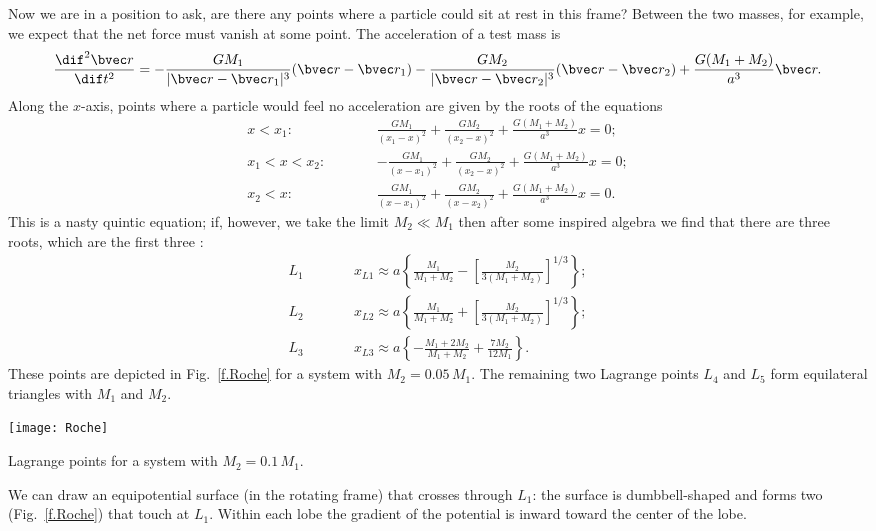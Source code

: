 Now we are in a position to ask, are there any points where a particle could sit at rest in this frame?
Between the two masses, for example, we expect that the net force must vanish at some point. The acceleration of a test mass is 
\begin{equation}\label{e.test-mass-acceleration-x}
\DDtt{\rv} = -\frac{GM_{1}}{|\rv-\rv_{1}|^{3}}(\rv-\rv_{1}) - \frac{GM_{2}}{|\rv-\rv_{2}|^{3}}(\rv-\rv_{2}) + \frac{G(M_{1}+M_{2})}{a^{3}} \rv.
\end{equation}
Along the $x$-axis, points where a particle would feel no acceleration are given by the roots of the equations
\begin{eqnarray*}
	x < x_{1}:&\qquad& \frac{GM_{1}}{(x_{1}-x)^{2}} + \frac{GM_{2}}{(x_{2}-x)^{2}} + \frac{G(M_{1}+M_{2})}{a^{3}} x = 0;\\
	x_{1} < x < x_{2}:&\qquad& -\frac{GM_{1}}{(x-x_{1})^{2}} + \frac{GM_{2}}{(x_{2}-x)^{2}} + \frac{G(M_{1}+M_{2})}{a^{3}} x = 0;\\
	x_{2} < x:&\qquad& \frac{GM_{1}}{(x-x_{1})^{2}} + \frac{GM_{2}}{(x-x_{2})^{2}} + \frac{G(M_{1}+M_{2})}{a^{3}} x = 0.
\end{eqnarray*}
This is a nasty quintic equation; if, however, we take the limit $M_{2}\ll M_{1}$ then after some inspired algebra we find that there are three roots, which are the first three :
\begin{eqnarray*}
L_{1} &\qquad& x_{L1} \approx a\left\{\frac{M_{1}}{M_{1}+M_{2}} - \left[\frac{M_{2}}{3(M_{1}+M_{2})}\right]^{1/3}\right\};\\
L_{2} &\qquad& x_{L2} \approx a\left\{\frac{M_{1}}{M_{1}+M_{2}} + \left[\frac{M_{2}}{3(M_{1}+M_{2})}\right]^{1/3}\right\};\\
L_{3} &\qquad& x_{L3} \approx a\left\{-\frac{M_{1}+2M_{2}}{M_{1}+M_{2}} + \frac{7M_{2}}{12M_{1}}\right\}.
\end{eqnarray*}
These points are depicted in Fig.~\ref{f.Roche} for a system with $M_{2} = 0.05\,M_{1}$.
The remaining two Lagrange points $L_{4}$ and $L_{5}$ form equilateral triangles with $M_{1}$ and $M_{2}$.
\begin{marginfigure}[-8\baselineskip]
\texttt{[image: Roche]}
\caption{Lagrange points for a system with $M_{2} = 0.1\,M_{1}$.
\label{f.Roche}}
\end{marginfigure}
We can draw an equipotential surface (in the rotating frame) that crosses through $L_{1}$: the surface is dumbbell-shaped and forms two  (Fig.~\ref{f.Roche}) that touch at $L_{1}$.  Within each lobe the gradient of the potential is inward toward the center of the lobe.

